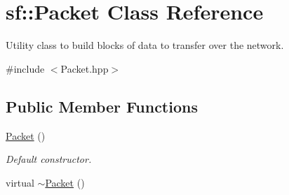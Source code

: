 \hypertarget{classsf_1_1Packet}{\section{sf\-:\-:Packet Class Reference}
\label{classsf_1_1Packet}
}


Utility class to build blocks of data to transfer over the network.  




{\ttfamily \#include $<$Packet.\-hpp$>$}

\subsection*{Public Member Functions}
\begin{DoxyCompactItemize}
\item 
\hyperlink{classsf_1_1Packet_a786e5d4ced83992ceefa1799963ea858}{Packet} ()
\begin{DoxyCompactList}\small\item\em Default constructor. \end{DoxyCompactList}\item 
\hypertarget{classsf_1_1Packet_adc0490ca3c7c3d1e321bd742e5213913}{virtual \hyperlink{classsf_1_1Packet_adc0490ca3c7c3d1e321bd742e5213913}{$\sim$\-Packet} ()}\label{classsf_1_1Packet_adc0490ca3c7c3d1e321bd742e5213913}


\end{DoxyCompactItemize}
